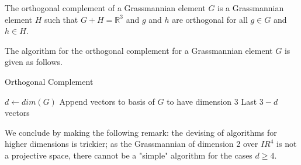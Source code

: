 \documentclass[12pt]{article}
\newcommand{\R}{\mathbb{R}}
\newenvironment{definition}[2][Definition]{\begin{trivlist}
\item[\hskip \labelsep {\bfseries #1}\hskip \labelsep {\bfseries #2.}]}{\end{trivlist}}
\newenvironment{proposition}[2][Proposition]{\begin{trivlist}
\item[\hskip \labelsep {\bfseries #1}\hskip \labelsep {\bfseries #2.}]}{\end{trivlist}}
\begin{document}
\begin{definition}{4.1}
The orthogonal complement of a Grassmannian element \(G\) is a Grassmannian element \(H\) such that \(G + H = \R^3\) and \(g\) and \(h\) are orthogonal for all \(g \in G\) and \(h \in H\).
\end{definition}

\begin{proposition}{4.2}
The algorithm for the orthogonal complement for a Grassmannian element \(G\) is given as follows.

\begin{algorithm}[H]
\caption{Orthogonal Complement}
\begin{algorithmic}[5]
\State $d \gets dim(G)$
\State Append vectors to basis of $G$ to have dimension 3
\Return Last $3-d$ vectors
\EndProcedure
\end{algorithmic}
\end{algorithm}

\end{proposition}

We conclude by making the following remark: the devising of algorithms for higher dimensions is trickier; as the Grassmannian of dimension 2 over \(IR^4\) is not a projective space, there cannot be a "simple" algorithm for the cases \(d \geq 4\). 



\end{document}
